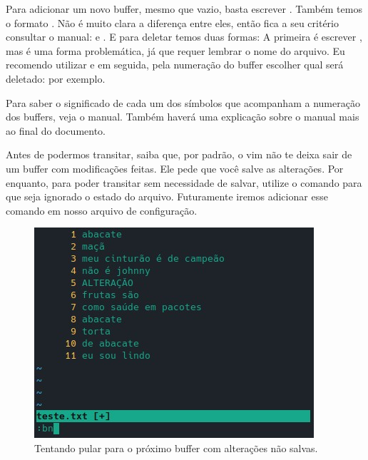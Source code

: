 Para adicionar um novo buffer, mesmo que vazio, basta escrever \newline
{}.
Também temos o formato .
Não é muito clara a diferença entre eles, então fica a seu critério consultar o manual:  e .
E para deletar temos duas formas: A primeira é escrever , mas
é uma forma problemática, já que requer lembrar o nome do arquivo.
Eu recomendo utilizar  e em seguida, pela numeração do buffer escolher qual será deletado:
 por exemplo.

Para saber o significado de cada um dos símbolos que acompanham a numeração dos buffers, veja o manual.
Também haverá uma explicação sobre o manual mais ao final do documento.

Antes de podermos transitar, saiba que, por padrão, o vim não te deixa sair de um buffer com modificações feitas.
Ele pede que você salve as alterações.
Por enquanto, para poder transitar sem necessidade de salvar, utilize o comando  para
que seja ignorado o estado do arquivo.
Futuramente iremos adicionar esse comando em nosso arquivo de configuração.

\begin{figure}[!htb]
\centering
\includegraphics[scale=0.80]{recursos_avancados/bn_setHidden.jpg}
\caption{Tentando pular para o próximo buffer com alterações não salvas.}
\end{figure}


